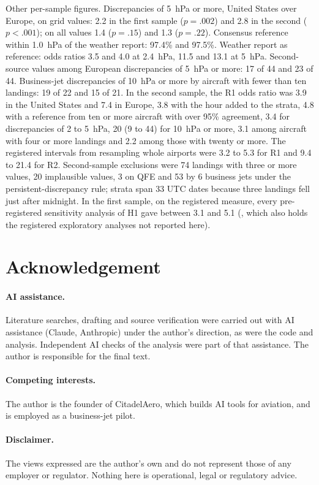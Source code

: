 \documentclass[11pt]{article}
\begin{document}
Other per-sample figures. Discrepancies of 5~hPa or more, United States over Europe, on grid values: 2.2 in the first sample ($p = .002$) and 2.8 in the second ($p < .001$); on all values 1.4 ($p = .15$) and 1.3 ($p = .22$). Consensus reference within 1.0~hPa of the weather report: 97.4\% and 97.5\%. Weather report as reference: odds ratios 3.5 and 4.0 at 2.4~hPa, 11.5 and 13.1 at 5~hPa. Second-source values among European discrepancies of 5~hPa or more: 17 of 44 and 23 of 44. Business-jet discrepancies of 10~hPa or more by aircraft with fewer than ten landings: 19 of 22 and 15 of 21. In the second sample, the R1 odds ratio was 3.9 in the United States and 7.4 in Europe, 3.8 with the hour added to the strata, 4.8 with a reference from ten or more aircraft with over 95\% agreement, 3.4 for discrepancies of 2 to 5~hPa, 20 (9 to 44) for 10~hPa or more, 3.1 among aircraft with four or more landings and 2.2 among those with twenty or more. The registered intervals from resampling whole airports were 3.2 to 5.3 for R1 and 9.4 to 21.4 for R2. Second-sample exclusions were 74 landings with three or more values, 20 implausible values, 3 on QFE and 53 by 6 business jets under the persistent-discrepancy rule; strata span 33 UTC dates because three landings fell just after midnight. In the first sample, on the registered measure, every pre-registered sensitivity analysis of H1 gave between 3.1 and 5.1 (, which also holds the registered exploratory analyses not reported here).

\section*{Acknowledgement}
\paragraph{AI assistance.} Literature searches, drafting and source verification were carried out with AI assistance (Claude, Anthropic) under the author's direction, as were the code and analysis. Independent AI checks of the analysis were part of that assistance. The author is responsible for the final text.
\paragraph{Competing interests.} The author is the founder of CitadelAero, which builds AI tools for aviation, and is employed as a business-jet pilot.
\paragraph{Disclaimer.} The views expressed are the author's own and do not represent those of any employer or regulator. Nothing here is operational, legal or regulatory advice.
\end{document}
